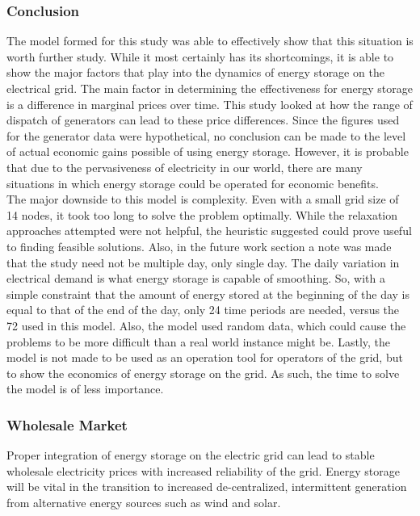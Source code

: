 \subsubsection{Conclusion}
The model formed for this study was able to effectively show that this situation is worth further
study. While it most certainly has its shortcomings, it is able to show the major factors that play into the
dynamics of energy storage on the electrical grid. The main factor in determining the effectiveness for
energy storage is a difference in marginal prices over time. This study looked at how the range of
dispatch of generators can lead to these price differences. Since the figures used for the generator data
were hypothetical, no conclusion can be made to the level of actual economic gains possible of using
energy storage. However, it is probable that due to the pervasiveness of electricity in our world, there
are many situations in which energy storage could be operated for economic benefits.  \\

The major downside to this model is complexity. Even with a small grid size of 14 nodes, it took
too long to solve the problem optimally. While the relaxation approaches attempted were not helpful,
the heuristic suggested could prove useful to finding feasible solutions. Also, in the future work section
a note was made that the study need not be multiple day, only single day. The daily variation in
electrical demand is what energy storage is capable of smoothing. So, with a simple constraint that the
amount of energy stored at the beginning of the day is equal to that of the end of the day, only 24 time
periods are needed, versus the 72 used in this model. Also, the model used random data, which could
cause the problems to be more difficult than a real world instance might be. Lastly, the model is not
made to be used as an operation tool for operators of the grid, but to show the economics of energy
storage on the grid. As such, the time to solve the model is of less importance.

\subsubsection{Wholesale Market}
       	 Proper integration of energy storage on the electric grid can lead to stable wholesale electricity prices with increased reliability of the grid. Energy storage 	will be vital in the transition to increased de-centralized, intermittent generation from alternative energy sources such as wind and solar.  \\

